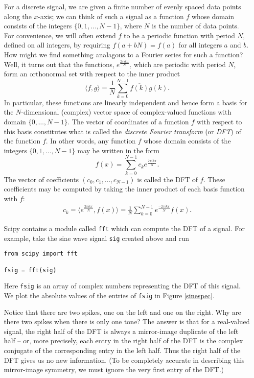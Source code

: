 For a discrete signal, we are given a finite number of evenly spaced data points along the $x$-axis; we can think of such a signal as a function $f$ whose domain consists of the integers $\{0,1,\dots,N-1\}$, where $N$ is the number of data points. 
For convenience, we will often extend $f$ to be a periodic function with period $N$, defined on all integers, by requiring $f(a+bN)=f(a)$ for all integers $a$ and $b$. 
How might we find something analagous to a Fourier series for such a function? 
Well, it turns out that the functions, $e^{\frac{2\pi ikx}N}$, which are periodic with period $N$, form an orthonormal set with respect to the inner product
\[
\langle f,g\rangle = \frac1N\sum_{k=0}^{N-1}\overline{f(k)}g(k).
\]
In particular, these functions are linearly independent and hence form a basis for the $N$-dimensional (complex) vector space of complex-valued functions with domain $\{0,\dots,N-1\}$. The vector of coordinates of a function $f$ with respect to this basis constitutes what is called the \emph{discrete Fourier transform} (or \emph{DFT}) of the function $f$. In other words, any function $f$ whose domain consists of the integers $\{0,1,\dots,N-1\}$ may be written in the form
\[
f(x)=\sum_{k=0}^{N-1}c_ke^{\frac{2\pi ikx}N}.
\]
The vector of coefficients $(c_0,c_1,\dots,c_{N-1})$ is called the DFT of $f$. These coefficients may be computed by taking the inner product of each basis function with $f$:
\begin{align}
	c_k=\langle e^{\frac{2\pi ikx}N}, f(x)\rangle=\frac1N\sum_{k=0}^{N-1}e^{\frac{-2\pi ikx}N}f(x) . \label{transform_coefficients}
\end{align}

Scipy contains a module called \texttt{fft} which can compute the DFT of a signal. %
For example, take the sine wave signal \texttt{sig} created above and run
\begin{lstlisting}
from scipy import fft

fsig = fft(sig)
\end{lstlisting}
Here \texttt{fsig} is an array of complex numbers representing the DFT of this signal. We plot the absolute values of the entries of \texttt{fsig} in Figure \ref{sinespec}.

Notice that there are two spikes, one on the left and one on the right. Why are there two spikes when there is only one tone? The answer is that for a real-valued signal, the right half of the DFT is always a mirror-image duplicate of the left half -- or, more precisely, each entry in the right half of the DFT is the complex conjugate of the corresponding entry in the left half. Thus the right half of the DFT gives us no new information. (To be completely accurate in describing this mirror-image symmetry, we must ignore the very first entry of the DFT.)
% 


